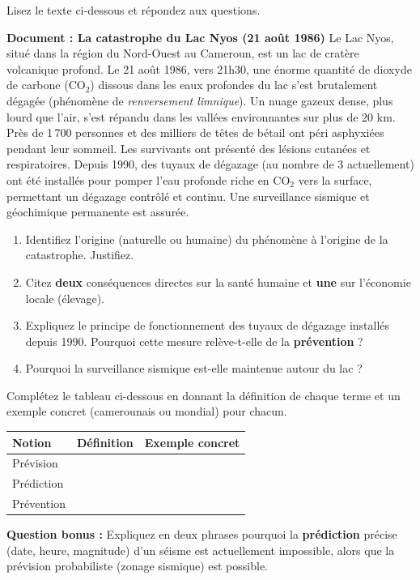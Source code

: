 \documentclass[11pt]{article}
\begin{document}
\begin{exercice}
Lisez le texte ci-dessous et répondez aux questions.

\textbf{Document : La catastrophe du Lac Nyos (21 août 1986)}
Le Lac Nyos, situé dans la région du Nord-Ouest au Cameroun, est un lac de cratère volcanique profond. Le 21 août 1986, vers 21h30, une énorme quantité de dioxyde de carbone (CO$_2$) dissous dans les eaux profondes du lac s'est brutalement dégagée (phénomène de \emph{renversement limnique}). Un nuage gazeux dense, plus lourd que l'air, s'est répandu dans les vallées environnantes sur plus de 20 km. Près de 1\,700 personnes et des milliers de têtes de bétail ont péri asphyxiées pendant leur sommeil. Les survivants ont présenté des lésions cutanées et respiratoires.
Depuis 1990, des tuyaux de dégazage (au nombre de 3 actuellement) ont été installés pour pomper l'eau profonde riche en CO$_2$ vers la surface, permettant un dégazage contrôlé et continu. Une surveillance sismique et géochimique permanente est assurée.

\begin{enumerate}
\item Identifiez l'origine (naturelle ou humaine) du phénomène à l'origine de la catastrophe. Justifiez.
\item Citez \textbf{deux} conséquences directes sur la santé humaine et \textbf{une} sur l'économie locale (élevage).
\item Expliquez le principe de fonctionnement des tuyaux de dégazage installés depuis 1990. Pourquoi cette mesure relève-t-elle de la \textbf{prévention} ?
\item Pourquoi la surveillance sismique est-elle maintenue autour du lac ?
\end{enumerate}
\end{exercice}

\begin{exercice}
Complétez le tableau ci-dessous en donnant la définition de chaque terme et un exemple concret (camerounais ou mondial) pour chacun.

\begin{center}
\begin{tabularx}{\linewidth}{|l|X|X|}\hline
\rowcolor{popblueL}\textbf{Notion} & \textbf{Définition} & \textbf{Exemple concret} \\ \hline
Prévision & & \\ \hline
Prédiction & & \\ \hline
Prévention & & \\ \hline
\end{tabularx}
\end{center}

\textbf{Question bonus :} Expliquez en deux phrases pourquoi la \textbf{prédiction} précise (date, heure, magnitude) d'un séisme est actuellement impossible, alors que la prévision probabiliste (zonage sismique) est possible.
\end{exercice}
\end{document}
